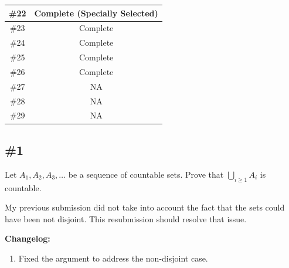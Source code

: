 \documentclass{article}
\theoremstyle{plain} %
\numberwithin{thm}{section} %
\theoremstyle{definition}
\begin{document}
\begin{center}
\begin{tabular}{ | c | c |}
            \hline
            \#22 & Complete (Specially Selected)\\
            \hline
            \#23 & Complete \\
            \hline
            \#24 & Complete \\
            \hline
            \#25 & Complete \\
            \hline
            \#26 & Complete \\
            \hline
            \#27 & NA \\
            \hline
            \#28 & NA \\
            \hline
            \#29 & NA \\
            \hline
        \end{tabular}
    \end{center}
    \subsection{\#1}

    Let $A_1,A_2,A_3,\ldots$ be a sequence of countable sets. Prove that $\bigcup_{i\geq 1} A_i$ is countable.

    \smallskip

    \noindent My previous submission did not take into account the fact that the sets could have been not disjoint. This resubmission should resolve that issue.


    \noindent\textbf{Changelog:}\begin{enumerate}
        \item Fixed the argument to address the non-disjoint case.
    \end{enumerate}
\end{document}
